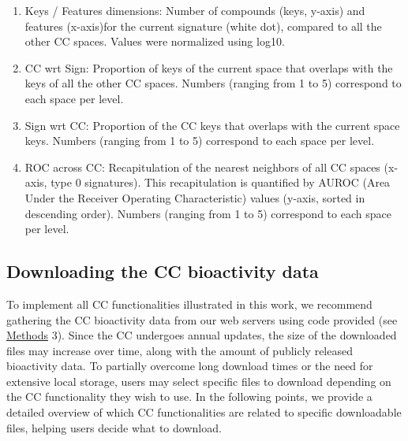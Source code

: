 \begin{enumerate}
    \item[\textbullet]Keys / Features dimensions: Number of compounds (keys, y-axis) and features (x-axis)for the current signature (white dot), compared to all the other CC spaces. Values were normalized using log10.
    \item[\textbullet]CC wrt Sign: Proportion of keys of the current space that overlaps with the keys of all the other CC spaces. Numbers (ranging from 1 to 5) correspond to each space per level.
    \item[\textbullet]Sign wrt CC: Proportion of the CC keys that overlaps with the current space keys. Numbers (ranging from 1 to 5) correspond to each space per level.
    \item[\textbullet]ROC across CC: Recapitulation of the nearest neighbors of all CC spaces (x-axis, type 0 signatures). This recapitulation is quantified by AUROC (Area Under the Receiver Operating Characteristic) values (y-axis, sorted in descending order). Numbers (ranging from 1 to 5) correspond to each space per level.
\end{enumerate}


\subsection{Downloading the CC bioactivity data}
\label{Supplementary_Protocols_DownloadingData}

To implement all CC functionalities illustrated in this work, we recommend gathering the CC bioactivity data from our web servers using code provided (see \hyperref[Protocols_Methods]{Methods} 3). Since the CC undergoes annual updates, the size of the downloaded files may increase over time, along with the amount of publicly released bioactivity data. To partially overcome long download times or the need for extensive local storage, users may select specific files to download depending on the CC functionality they wish to use. In the following points, we provide a detailed overview of which CC functionalities are related to specific downloadable files, helping users decide what to download.

